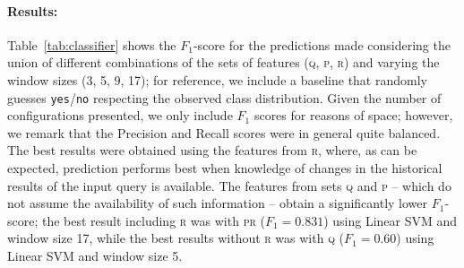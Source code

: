 \documentclass[runningheads]{llncs}
\begin{document}


\paragraph{Results:} Table~\ref{tab:classifier} shows the $F_1$-score for the predictions made considering the union of different combinations of the sets of features (\textsc{q}, \textsc{p}, \textsc{r}) and varying the window sizes (3, 5, 9, 17); for reference, we include a baseline that randomly guesses \texttt{yes}/\texttt{no} respecting the observed class distribution. Given the number of configurations presented, we only include $F_1$ scores for reasons of space; however, we remark that the Precision and Recall scores were in general quite balanced. The best results were obtained using the features from \textsc{r}, where, as can be expected, prediction performs best when knowledge of changes in the historical results of the input query is available. The features from sets \textsc{q} and \textsc{p} -- which do not assume the availability of such information -- obtain a significantly lower $F_1$-score; the best result including \textsc{r} was with \textsc{pr} ($F_1 = 0.831$) using Linear SVM and window size 17, while the best results without \textsc{r} was with \textsc{q} ($F_1 = 0.60$) using Linear SVM and window size 5.
\end{document}
